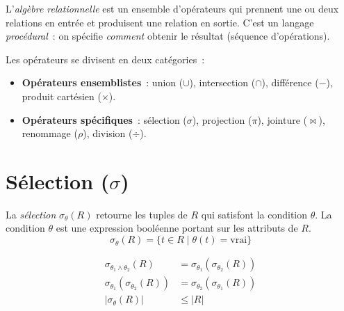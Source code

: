 \begin{definition}
L'\emph{alg\`ebre relationnelle} est un ensemble d'op\'erateurs qui prennent
une ou deux relations en entr\'ee et produisent une relation en sortie.
C'est un langage \emph{proc\'edural}~: on sp\'ecifie \emph{comment}
obtenir le r\'esultat (s\'equence d'op\'erations).
\end{definition}

Les op\'erateurs se divisent en deux cat\'egories~:
\begin{itemize}
    \item \textbf{Op\'erateurs ensemblistes}~: union ($\cup$), intersection ($\cap$),
          diff\'erence ($-$), produit cart\'esien ($\times$).
    \item \textbf{Op\'erateurs sp\'ecifiques}~: s\'election ($\sigma$), projection ($\pi$),
          jointure ($\bowtie$), renommage ($\rho$), division ($\div$).
\end{itemize}

\section{S\'election ($\sigma$)}

\begin{definition}[S\'election]
La \emph{s\'election} $\sigma_\theta(R)$ retourne les tuples de $R$ qui satisfont
la condition $\theta$. La condition $\theta$ est une expression bool\'eenne
portant sur les attributs de $R$.
\[
\sigma_\theta(R) = \{ t \in R \mid \theta(t) = \text{vrai} \}
\]
\end{definition}

\begin{formules}[title=\textbf{Propri\'et\'es de la s\'election}]
\begin{align}
\sigma_{\theta_1 \land \theta_2}(R) &= \sigma_{\theta_1}(\sigma_{\theta_2}(R)) \tag{cascade}\\
\sigma_{\theta_1}(\sigma_{\theta_2}(R)) &= \sigma_{\theta_2}(\sigma_{\theta_1}(R)) \tag{commutativit\'e}\\
|\sigma_\theta(R)| &\leq |R| \tag{cardinalit\'e}
\end{align}
\end{formules}

